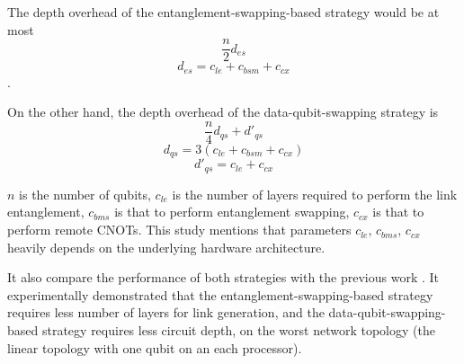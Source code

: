  The depth overhead of the entanglement-swapping-based strategy would be at most 
 $$\frac{n}{2}d_{es}$$
 $$d_{es} = c_{le} + c_{bsm} + c_{cx}$$. 
 
  On the other hand, the depth overhead of the data-qubit-swapping strategy is 
  $$ \frac{n}{4}d_{qs} + d'_{qs}$$ 
  $$ d_{qs} = 3(c_{le} + c_{bsm} + c_{cx})$$
  $$ d'_{qs} = c_{le} + c_{cx}$$
  
  $n$ is the number of qubits, $c_{le}$ is the number of layers required to perform the link entanglement, $c_{bms}$ is that to perform entanglement swapping, $c_{cx}$ is that to perform remote CNOTs.
  This study mentions that parameters $c_{le}$, $c_{bms}$, $c_{cx}$ heavily depends on the underlying hardware architecture.
  
  It also compare the performance of both strategies with the previous work \cite{hypergraph}.  It experimentally demonstrated that the entanglement-swapping-based strategy requires less number of layers for link generation, and the data-qubit-swapping-based strategy requires less circuit depth, on the worst network topology (the linear topology with one qubit on an each processor).


